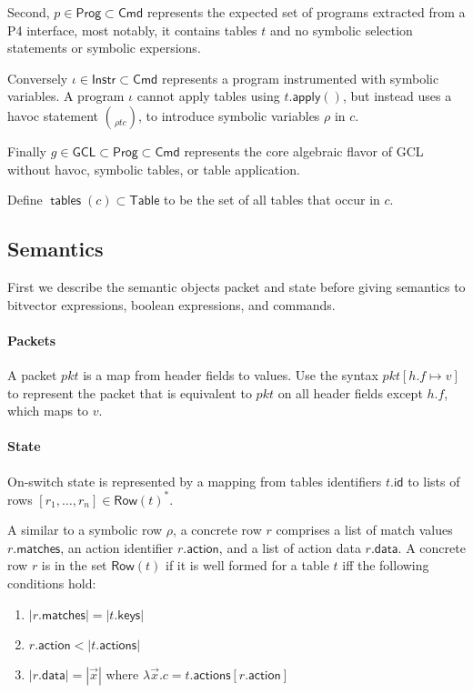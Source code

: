 \documentclass{article}
\newcommand{\pkt}{\mathit{pkt}}
\newcommand{\Cmd}{\mathsf{Cmd}}
\newcommand{\Instr}{\mathsf{Instr}}
\newcommand{\Prog}{\mathsf{Prog}}
\newcommand{\GCL}{\mathsf{GCL}}
\newcommand{\Table}{\mathsf{Table}}
\newcommand{\Row}{\mathsf{Row}}
\newcommand{\matches}{\mathsf{matches}}
\newcommand{\action}{\mathsf{action}}
\newcommand{\actions}{\mathsf{actions}}
\newcommand{\keys}{\mathsf{keys}}
\newcommand{\data}{\mathsf{data}}
\newcommand{\id}{\mathsf{id}}
\newcommand{\apply}{\mathsf{apply}}
\newcommand{\tables}{\mathop{\mathsf{tables}}}
\begin{document}
Second, $p \in \Prog \subset \Cmd$ represents the expected set of programs extracted from a
P4 interface, most notably, it contains tables $t$ and no symbolic selection
statements or symbolic expersions.

Conversely $\iota \in \Instr \subset \Cmd$ represents a program instrumented
with symbolic variables. A program $\iota$ cannot apply tables using
$t.\apply()$, but instead uses a havoc statement $\choose \rho t c$, to
introduce symbolic variables $\rho$ in $c$.

Finally $g \in \GCL \subset \Prog \subset \Cmd$ represents the core algebraic
flavor of GCL without havoc, symbolic tables, or table application.


Define $\tables(c) \subset \Table$ to be the set of all tables that occur in $c$.

\subsection{Semantics}

First we describe the semantic objects packet and state before giving semantics
to bitvector expressions, boolean expressions, and commands.

\paragraph{Packets}
A packet $\pkt$ is a map from header fields to values. Use the syntax $\pkt[h.f
  \mapsto v]$ to represent the packet that is equivalent to $\pkt$ on all header
fields except $h.f$, which maps to $v$.

\paragraph{State}
On-switch state is represented by a mapping from tables identifiers $t.\id$ to
lists of rows $[r_1,\ldots,r_n] \in \Row(t)^*$.

A similar to a symbolic row $\rho$, a concrete row $r$ comprises a list of match
values $r.\matches$, an action identifier $r.\action$, and a list of action data
$r.\data$. A concrete row $r$ is in the set $\Row(t)$ if it is well formed for a
table $t$ iff the following conditions hold:
\begin{enumerate}
\item $|r.\matches| = |t.\keys|$
\item $r.\action < |t.\actions|$
\item $|r.\data| = |\vec x|$ where $\lambda \vec x. c = t.\actions[r.\action]$
\end{enumerate}\
\end{document}
